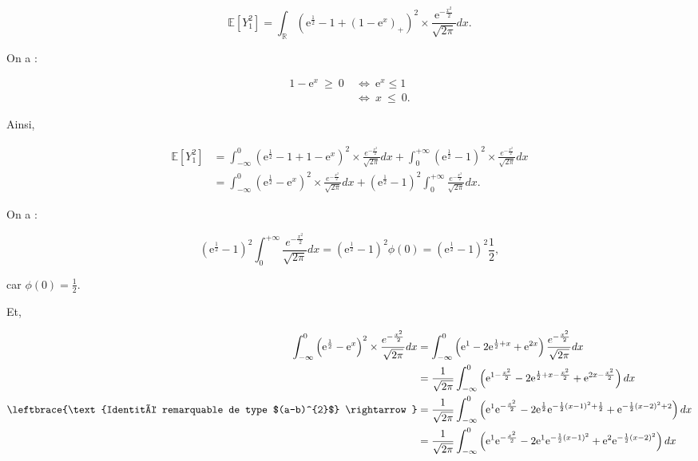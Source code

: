 \documentclass{article}
\theoremstyle{exostyle}
\newenvironment{questions}{
\begin{enumerate}[\hspace{12pt} 1.]}{\end{enumerate}}
\begin{document}
\begin{questions}
\[\mathbb{E}[Y_{1}^{2}] = \int_{\mathbb{R}} \left( \text{e}^{\frac{1}{2}} - 1 + \left(1-\text{e}^{x} \right)_{+} \right)^{2} \times \frac{\text{e}^{-\frac{x^{2}}{2}}}{\sqrt{2\pi}}dx.\]

On a : 

\begin{align*}
    1-\text{e}^{x} \ \geq \ 0 \ &\Leftrightarrow \ \text{e}^{x} \leq 1\\
    &\Leftrightarrow \ x \ \leq \ 0.
\end{align*}

Ainsi, 

\begin{align*}
    \mathbb{E}\left[ Y_{1}^{2} \right] &= \int_{-\infty}^{0} \left(\text{e}^{\frac{1}{2}} - 1 + 1-\text{e}^{x}\right)^{2} \times \frac{e^{-\frac{x^{2}}{2}}}{\sqrt{2\pi}}dx + \int_{0}^{+\infty} \left( \text{e}^{\frac{1}{2}} - 1 \right)^{2} \times \frac{e^{-\frac{x^{2}}{2}}}{\sqrt{2\pi}}dx\\
    &= \int_{-\infty}^{0} \left(\text{e}^{\frac{1}{2}} - \text{e}^{x}\right)^{2} \times \frac{e^{-\frac{x^{2}}{2}}}{\sqrt{2\pi}}dx + \left( \text{e}^{\frac{1}{2}} - 1 \right)^{2} \int_{0}^{+\infty} \frac{e^{-\frac{x^{2}}{2}}}{\sqrt{2\pi}}dx.
\end{align*}

On a :

\[\left( \text{e}^{\frac{1}{2}} - 1 \right)^{2} \int_{0}^{+\infty} \frac{e^{-\frac{x^{2}}{2}}}{\sqrt{2\pi}}dx = \left( \text{e}^{\frac{1}{2}} - 1 \right)^{2} \phi(0) = \left( \text{e}^{\frac{1}{2}} - 1 \right)^{2} \frac{1}{2},\]

car $\phi(0) = \frac{1}{2}$.

Et, 

\begin{align*}
    \int_{-\infty}^{0} \left(\text{e}^{\frac{1}{2}} - \text{e}^{x}\right)^{2} \times \frac{e^{-\frac{x^{2}}{2}}}{\sqrt{2\pi}}dx &= \int_{-\infty}^{0} \left( \text{e}^{1} - 2\text{e}^{\frac{1}{2}+x} + \text{e}^{2x} \right) \frac{e^{-\frac{x^{2}}{2}}}{\sqrt{2\pi}}dx\\
    &= \frac{1}{\sqrt{2\pi}} \int_{-\infty}^{0} \left( \text{e}^{1 -\frac{x^{2}}{2}} - 2\text{e}^{\frac{1}{2}+x-\frac{x^{2}}{2}} + \text{e}^{2x - \frac{x^{2}}{2}} \right)dx\\
    \leftbrace{\text{Identité remarquable de type $(a-b)^{2}$} \rightarrow} &= \frac{1}{\sqrt{2\pi}} \int_{-\infty}^{0} \left( \text{e}^{1} \text{e}^{-\frac{x^{2}}{2}} - 2\text{e}^{\frac{1}{2}}\text{e}^{-\frac{1}{2}\left( x-1 \right)^{2} + \frac{1}{2}} + \text{e}^{-\frac{1}{2}\left( x-2 \right)^{2} + 2} \right)dx\\
    &= \frac{1}{\sqrt{2\pi}} \int_{-\infty}^{0} \left( \text{e}^{1} \text{e}^{-\frac{x^{2}}{2}} - 2\text{e}^{1}\text{e}^{-\frac{1}{2}\left( x-1 \right)^{2}} + \text{e}^{2}\text{e}^{-\frac{1}{2}\left( x-2 \right)^{2}} \right)dx
\end{align*}


\end{questions}
\end{document}
